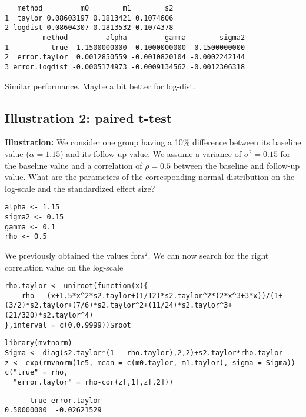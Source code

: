 \documentclass[12pt]{article}
\begin{document}
\begin{verbatim}
   method         m0        m1        s2
1  taylor 0.08603197 0.1813421 0.1074606
2 logdist 0.08604307 0.1813532 0.1074378
         method         alpha         gamma        sigma2
1          true  1.1500000000  0.1000000000  0.1500000000
2  error.taylor  0.0012850559 -0.0010820104 -0.0002242144
3 error.logdist -0.0005174973 -0.0009134562 -0.0012306318
\end{verbatim}
Similar performance. Maybe a bit better for log-dist.

\subsection{Illustration 2: paired t-test}
\label{sec:orgeeca273}

\textbf{Illustration:} We consider one group having a 10\% difference
between its baseline value (\(\alpha=1.15\)) and its follow-up
value. We assume a variance of \(\sigma^2 = 0.15\) for the baseline
value and a correlation of \(\rho=0.5\) between the baseline and
follow-up value. What are the parameters of the corresponding normal
distribution on the log-scale and the standardized effect size?
\lstset{language=r,label= ,caption= ,captionpos=b,numbers=none}
\begin{lstlisting}
alpha <- 1.15
sigma2 <- 0.15
gamma <- 0.1
rho <- 0.5
\end{lstlisting}

We previously obtained the values for\(s^2\). We can now search for
the right correlation value on the log-scale
\lstset{language=r,label= ,caption= ,captionpos=b,numbers=none}
\begin{lstlisting}
rho.taylor <- uniroot(function(x){
    rho - (x+1.5*x^2*s2.taylor+(1/12)*s2.taylor^2*(2*x^3+3*x))/(1+(3/2)*s2.taylor+(7/6)*s2.taylor^2+(11/24)*s2.taylor^3+(21/320)*s2.taylor^4)
},interval = c(0,0.9999))$root
\end{lstlisting}

\lstset{language=r,label= ,caption= ,captionpos=b,numbers=none}
\begin{lstlisting}
library(mvtnorm)
Sigma <- diag(s2.taylor*(1 - rho.taylor),2,2)+s2.taylor*rho.taylor
z <- exp(rmvnorm(1e5, mean = c(m0.taylor, m1.taylor), sigma = Sigma))
c("true" = rho,
  "error.taylor" = rho-cor(z[,1],z[,2]))
\end{lstlisting}

\begin{verbatim}
      true error.taylor 
0.50000000  -0.02621529
\end{verbatim}
\end{document}

